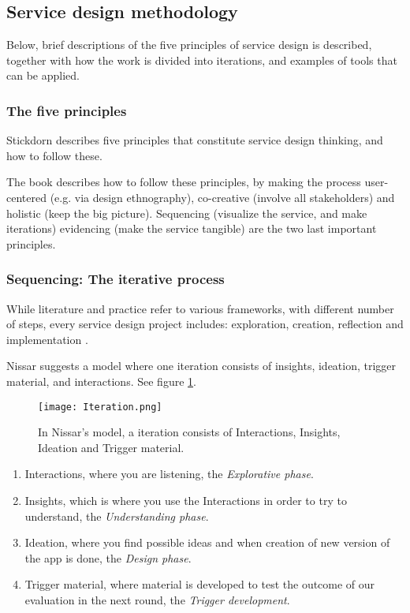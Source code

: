 \subsection{Service design methodology}

Below, brief descriptions of the five principles of service design is described, together with how the work is divided into iterations, and examples of tools that can be applied.

\subsubsection{The five principles}
Stickdorn \cite{stickdorn} describes five principles that constitute service design thinking, and how to follow these.

The book describes how to follow these principles, by making the process user-centered (e.g. via design ethnography), co-creative (involve all stakeholders) and holistic (keep the big picture). Sequencing (visualize the service, and make iterations) evidencing (make the service tangible) are the two last important principles.

\subsubsection{Sequencing: The iterative process}
While literature and practice refer to various frameworks, with different number of steps, every service design project includes: exploration, creation, reflection and implementation \cite{stickdorn}.

Nissar \cite{expedition-mondial} suggests a model where one iteration consists of insights, ideation, trigger material, and interactions. See figure \ref{fig:iteration}.

\begin{figure}[h]
    \centering
    \texttt{[image: Iteration.png]}
    \caption{In Nissar's model, a iteration consists of Interactions, Insights, Ideation and Trigger material.}
    \label{fig:iteration}
\end{figure}

\begin{enumerate}
\item Interactions, where you are listening, the \textit{Explorative phase}.
\item Insights, which is where you use the Interactions in order to try to understand, the \textit{Understanding phase}. %
\item Ideation, where you find possible ideas and when creation of new version of the app is done, the \textit{Design phase}.
\item Trigger material, where material is developed to test the outcome of our evaluation in the next round, the \textit{Trigger development}.
\end{enumerate}

